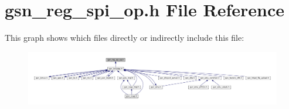 \hypertarget{a00572}{
\section{gsn\_\-reg\_\-spi\_\-op.h File Reference}
\label{a00572}
}
This graph shows which files directly or indirectly include this file:
\nopagebreak
\begin{figure}[H]
\begin{center}
\leavevmode
\includegraphics[width=400pt]{a00809}
\end{center}
\end{figure}
